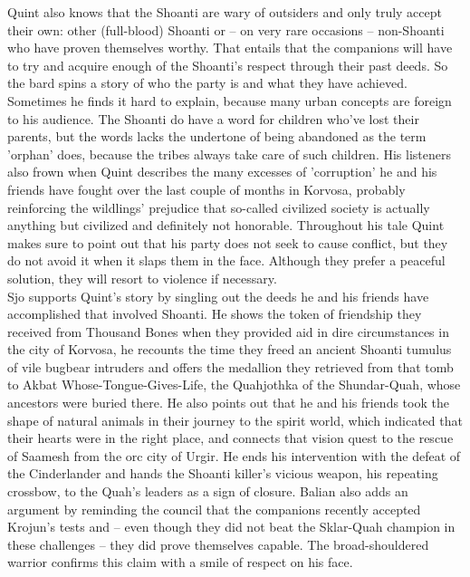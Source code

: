 Quint also knows that the Shoanti are wary of outsiders and only truly accept their own: other (full-blood) Shoanti or -- on very rare occasions -- non-Shoanti who have proven themselves worthy. That entails that the companions will have to try and acquire enough of the Shoanti's respect through their past deeds. So the bard spins a story of who the party is and what they have achieved. Sometimes he finds it hard to explain, because many urban concepts are foreign to his audience. The Shoanti do have a word for children who've lost their parents, but the words lacks the undertone of being abandoned as the term 'orphan' does, because the tribes always take care of such children. His listeners also frown when Quint describes the many excesses of 'corruption' he and his friends have fought over the last couple of months in Korvosa, probably reinforcing the wildlings' prejudice that so-called civilized society is actually anything but civilized and definitely not honorable. Throughout his tale Quint makes sure to point out that his party does not seek to cause conflict, but they do not avoid it when it slaps them in the face. Although they prefer a peaceful solution, they will resort to violence if necessary.\\

Sjo supports Quint's story by singling out the deeds he and his friends have accomplished that involved Shoanti. He shows the token of friendship they received from Thousand Bones when they provided aid in dire circumstances in the city of Korvosa, he recounts the time they freed an ancient Shoanti tumulus of vile bugbear intruders and offers the medallion they retrieved from that tomb to Akbat Whose-Tongue-Gives-Life, the Quahjothka of the Shundar-Quah, whose ancestors were buried there. He also points out that he and his friends took the shape of natural animals in their journey to the spirit world, which indicated that their hearts were in the right place, and connects that vision quest to the rescue of Saamesh from the orc city of Urgir. He ends his intervention with the defeat of the Cinderlander and hands the Shoanti killer's vicious weapon, his repeating crossbow, to the Quah's leaders as a sign of closure. Balian also adds an argument by reminding the council that the companions recently accepted Krojun's tests and -- even though they did not beat the Sklar-Quah champion in these challenges -- they did prove themselves capable. The broad-shouldered warrior confirms this claim with a smile of respect on his face.\\

